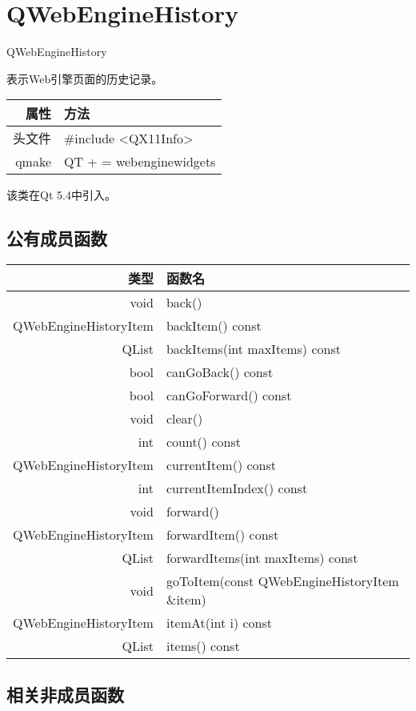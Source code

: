 \chapter{QWebEngineHistory}

QWebEngineHistory 

表示Web引擎页面的历史记录。

\begin{tabular}{|r|l|}
	\hline
	属性 & 方法 \\
	\hline
	头文件 & \#include <QX11Info>\\      
	\hline
	qmake & QT + = webenginewidgets \\      
	\hline
\end{tabular}

该类在Qt 5.4中引入。

\section{公有成员函数}


\begin{tabular}{|r|l|}
	\hline
	类型 & 函数名 \\
	\hline
	void	& back()\\
	\hline
	QWebEngineHistoryItem	& backItem() const \\
	\hline
	QList&	backItems(int maxItems) const \\
	\hline
	bool	&canGoBack() const \\
	\hline
	bool & canGoForward() const \\ 
	\hline
	void &	clear()\\ 
	\hline
	int &	count() const \\
	\hline
	QWebEngineHistoryItem &currentItem()
	 const \\
	\hline
	int &	currentItemIndex() const \\ 
	\hline
	void &	forward() \\ 
	\hline
	QWebEngineHistoryItem &	forwardItem() const \\ 
	\hline
	QList &	forwardItems(int maxItems) const \\
	\hline
	void &	goToItem(const
    QWebEngineHistoryItem \&item)\\
	\hline
	QWebEngineHistoryItem &	itemAt(int i) const \\ 
	\hline
	QList &	items() const \\ 
	\hline
\end{tabular}

\section{相关非成员函数}

